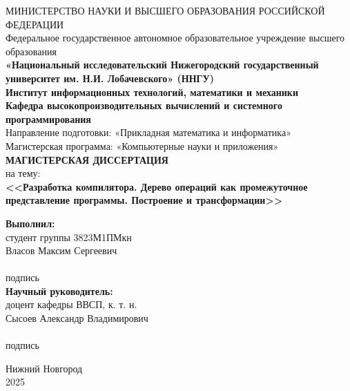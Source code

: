 \documentclass[a4paper,12pt,hidelinks]{extarticle}
\begin{document}
\begin{titlepage}
  \fontsize{14pt}{16.8pt}\selectfont
  \begin{center}
    МИНИСТЕРСТВО НАУКИ И ВЫСШЕГО ОБРАЗОВАНИЯ РОССИЙСКОЙ ФЕДЕРАЦИИ\\
    Федеральное государственное автономное образовательное учреждение высшего образования\\
    \textbf{«Национальный исследовательский Нижегородский государственный университет им. Н.И. Лобачевского» (ННГУ)}\\
    \vspace{1cm}
    \textbf{Институт информационных технологий, математики и механики}\\
    \textbf{Кафедра высокопроизводительных вычислений и системного программирования}\\
    Направление подготовки: «Прикладная математика и информатика»\\
    Магистерская программа: «Компьютерные науки и приложения»\\
    \vspace*{\fill}
    {\Large\textbf{МАГИСТЕРСКАЯ ДИССЕРТАЦИЯ}}\\
    \vspace{0.4cm}
    на тему:\\
    {\large\textbf{
      <<Разработка компилятора.
      Дерево операций как промежуточное представление программы.
      Построение и трансформации>>
    }}\\
    \vspace*{\fill}
  \end{center}
  \hfill
  \begin{minipage}{0.45\textwidth}
    \raggedright
    \textbf{Выполнил:}\\
    студент группы 3823М1ПМкн\\
    Власов Максим Сергеевич\\
    \vspace{0.4cm}
    \hrulefill\\
    \vspace*{-0.5\baselineskip}
    \noindent\hfill{\small подпись}\hfill\null\\
    \vspace{0.4cm}
    \textbf{Научный руководитель:}\\
    доцент кафедры ВВСП, к. т. н.\\
    Сысоев Александр Владимирович\\
    \vspace{0.4cm}
    \hrulefill\\
    \vspace*{-0.5\baselineskip}
    \noindent\hfill{\small подпись}\hfill\null\\
  \end{minipage}
  \vspace*{\fill}
  \begin{center}
    Нижний Новгород\\
    2025
  \end{center}
\end{titlepage}
\end{document}
